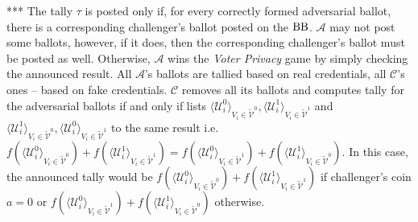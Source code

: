 *** The tally $\tau$ is posted only if, for every correctly formed adversarial ballot, there is a corresponding challenger's ballot posted on the $\operatorname{BB}$. $\mathcal{A}$ may not post some ballots, however, if it does, then the corresponding challenger's ballot must be posted as well. Otherwise, $\mathcal{A}$ wins the \textit{Voter Privacy} game by simply checking the announced result.  All $\mathcal{A}$'s ballots are tallied based on real credentials, all  $\mathcal{C}$'s ones -- based on fake credentials.   $\mathcal{C}$ removes all its  ballots and computes tally for the adversarial ballots if and only if  lists $\langle \mathcal{U}^0_i \rangle _{V_i \in \tilde{\mathcal{V}}^0}, \langle \mathcal{U}^1_i \rangle _{V_i \in \tilde{\mathcal{V}}^1}$ and $\langle \mathcal{U}^1_i \rangle _{V_i \in \tilde{\mathcal{V}}^0}, \langle \mathcal{U}^0_i \rangle _{V_i \in \tilde{\mathcal{V}}^1}$  to the same result i.e. $f(\langle \mathcal{U}^0_i \rangle _{V_i \in \tilde{\mathcal{V}}^0} ) + f(\langle \mathcal{U}^1_i \rangle _{V_i \in \tilde{\mathcal{V}}^1} ) =  f(\langle \mathcal{U}^0_i \rangle _{V_i \in \tilde{\mathcal{V}}^1} ) +  f(\langle \mathcal{U}^1_i \rangle _{V_i \in \tilde{\mathcal{V}}^0} )$. In this case, the announced tally would be $f(\langle \mathcal{U}^0_i \rangle _{V_i \in \tilde{\mathcal{V}}^0} ) + f(\langle \mathcal{U}^1_i \rangle _{V_i \in \tilde{\mathcal{V}}^1} )$ if challenger's coin $a=0$ or  $f(\langle \mathcal{U}^0_i \rangle _{V_i \in \tilde{\mathcal{V}}^1} ) +  f(\langle \mathcal{U}^1_i \rangle _{V_i \in \tilde{\mathcal{V}}^0} )$ otherwise.\\

